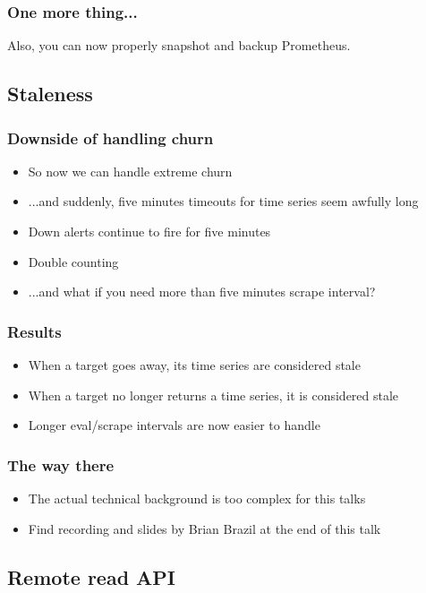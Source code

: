 \documentclass[t]{beamer}
\begin{document}
\begin{frame}
	\frametitle{One more thing...}
	\vfill
	Also, you can now properly snapshot and backup Prometheus.
	\vfill
\end{frame}


\subsection{Staleness}


\begin{frame}
	\frametitle{Downside of handling churn}
	\begin{itemize}
		\item So now we can handle extreme churn
		\item ...and suddenly, five minutes timeouts for time series seem awfully long
		\item Down alerts continue to fire for five minutes
		\item Double counting
		\item ...and what if you need more than five minutes scrape interval?
	\end{itemize}
\end{frame}

\begin{frame}
	\frametitle{Results}
	\begin{itemize}
		\item When a target goes away, its time series are considered stale
		\item When a target no longer returns a time series, it is considered stale
		\item Longer eval/scrape intervals are now easier to handle
	\end{itemize}
\end{frame}

\begin{frame}
	\frametitle{The way there}
	\begin{itemize}
		\item The actual technical background is too complex for this talks
		\item Find recording and slides by Brian Brazil at the end of this talk
	\end{itemize}
\end{frame}


\subsection{Remote read API}
\end{document}
